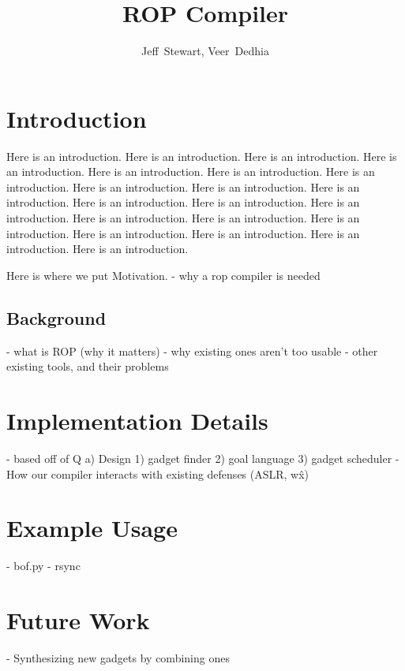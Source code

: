 \documentclass[journal]{IEEEtran}
\begin{document}
%
\title{ROP Compiler}

\author{Jeff~Stewart,
        Veer~Dedhia}



\maketitle

\section{Introduction}
Here is an introduction. Here is an introduction. Here is an introduction. Here is an introduction. Here is an introduction.
Here is an introduction. Here is an introduction. Here is an introduction. Here is an introduction. Here is an introduction.
Here is an introduction. Here is an introduction. Here is an introduction. Here is an introduction. Here is an introduction.
Here is an introduction. Here is an introduction. Here is an introduction. Here is an introduction. Here is an introduction.

Here is where we put Motivation.
  - why a rop compiler is needed

\subsection{Background}
  - what is ROP (why it matters)
  - why existing ones aren't too usable
      - other existing tools, and their problems

\section{Implementation Details}
    - based off of Q \cite{schwartz2011q}
    a) Design
        1) gadget finder
        2) goal language
        3) gadget scheduler
          - How our compiler interacts with existing defenses (ASLR, w\^x)

\section{Example Usage}
  - bof.py
  - rsync

\section{Future Work}
  - Synthesizing new gadgets by combining ones


{}
\end{document}
